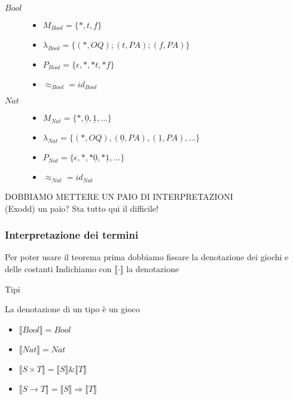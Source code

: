 \documentclass{beamer}
\begin{document}
\begin{frame}
	
		
	\begin{example}
		\begin{description}
			\item[$Bool$] \begin{itemize}
			              	\item $M_{Bool}=\{*,t,f\}$
			              	\item $\lambda_{Bool}= \{ (*,OQ) ; (t,PA) ; (f,PA) \}$
			              	\item $P_{Bool}= \{ \epsilon , * ,*t, *f \}$
			              	\item $\approx_{Bool} = id_{Bool}$
			              \end{itemize}

			\item[$Nat$] \begin{itemize}
			              	\item $M_{Nat}=\{ * , \underline{0} , \underline{1} , \dots \}$
			              	\item $\lambda_{Nat}= \{ (*,OQ) , (\underline{0},PA) , (\underline{1},PA) , \dots \}$
			              	\item $P_{Nat}= \{ \epsilon , * , *\underline{0} , *\underline{1} , \dots \}$
											\item $\approx_{Nat} = id_{Nat}$
			              \end{itemize}
		\end{description}

	\end{example}	
	DOBBIAMO METTERE UN PAIO DI INTERPRETAZIONI\\
	(Exodd) un paio? Sta tutto qui il difficile!
	
\end{frame}



\begin{frame}
	
	\frametitle{Interpretazione dei termini}
	
	Per poter usare il teorema prima dobbiamo fissare la denotazione dei giochi e delle costanti
	Indichiamo con $\llbracket \cdot \rrbracket$ la denotazione
	
	\begin{block}{Tipi}
		
		La denotazione di un tipo è un gioco
		
		\begin{itemize}
			\item $\llbracket Bool \rrbracket = Bool$
			\item $\llbracket Nat \rrbracket = Nat$
			\item $\llbracket S \times T \rrbracket = \llbracket S \rrbracket \& \llbracket T \rrbracket$
			\item $\llbracket S \rightarrow T \rrbracket = \llbracket S \rrbracket \Rightarrow \llbracket T \rrbracket$
		\end{itemize}
	\end{block}
	
	
	
\end{frame}
\end{document}
